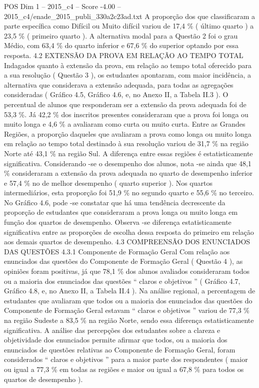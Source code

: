 \begin{textsample}{POS Dim 1 – 2015\_c4 – Score -4.00 – 2015\_c4/enade\_2015\_publi\_330a2c23ad.txt}
A proporção dos que classificaram a parte específica como Difícil ou Muito difícil variou de 17,4 \% ( último quarto ) a 23,5 \% ( primeiro quarto ).
A alternativa modal para a Questão 2 foi o grau Médio, com 63,4 \% do quarto inferior e 67,6 \% do superior optando por essa resposta. 4.2 EXTENSÃO DA PROVA EM RELAÇÃO AO TEMPO TOTAL Indagados quanto à extensão da prova, em relação ao tempo total oferecido para a sua resolução ( Questão 3 ), os estudantes apontaram, com maior incidência, a alternativa que considerava a extensão adequada, para todas as agregações consideradas ( Gráfico 4.5, Gráfico 4.6, e, no Anexo II, a Tabela II.3 ).
O percentual de alunos que responderam ser a extensão da prova adequada foi de 53,3 \%.
Já 42,2 \% dos inscritos presentes consideraram que a prova foi longa ou muito longa e 4,6 \% a avaliaram como curta ou muito curta.
Entre as Grandes Regiões, a proporção daqueles que avaliaram a prova como longa ou muito longa em relação ao tempo total destinado à sua resolução variou de 31,7 \% na região Norte até 43,1 \% na região Sul.
A diferença entre essas regiões é estatisticamente significativa.
Considerando -se o desempenho dos alunos, nota -se ainda que 48,1 \% consideraram a extensão da prova adequada no quarto de desempenho inferior e 57,4 \% no de melhor desempenho ( quarto superior ).
Nos quartos intermediários, esta proporção foi 51,9 \% no segundo quarto e 55,6 \% no terceiro.
No Gráfico 4.6, pode -se constatar que há uma tendência decrescente da proporção de estudantes que consideraram a prova longa ou muito longa em função dos quartos de desempenho.
Observa -se diferença estatisticamente significativa entre as proporções de escolha dessa resposta do primeiro em relação aos demais quartos de desempenho. 4.3 COMPREENSÃO DOS ENUNCIADOS DAS QUESTÕES 4.3.1 Componente de Formação Geral Com relação aos enunciados das questões do Componente de Formação Geral ( Questão 4 ), as opiniões foram positivas, já que 78,1 \% dos alunos avaliados consideraram todos ou a maioria dos enunciados das questões “ claros e objetivos ” ( Gráfico 4.7, Gráfico 4.8, e, no Anexo II, a Tabela II.4 ).
Na análise regional, a percentagem de estudantes que avaliaram que todos ou a maioria dos enunciados das questões do Componente de Formação Geral estavam “ claros e objetivos ” variou de 77,3 \% na região Sudeste a 83,5 \% na região Norte, sendo essa diferença estatisticamente significativa.
A análise das percepções dos estudantes sobre a clareza e objetividade dos enunciados permite afirmar que todos, ou a maioria dos enunciados de questões relativas ao Componente de Formação Geral, foram considerados “ claros e objetivos ” para a maior parte dos respondentes ( maior ou igual a 77,3 \% em todas as regiões e maior ou igual a 67,8 \% para todos os quartos de desempenho ).

\end{textsample}
